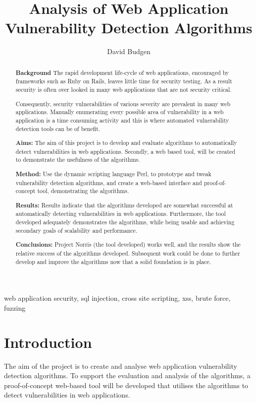 \documentclass[12pt,a4paper]{article}
\title{Analysis of Web Application Vulnerability Detection Algorithms}
\author{David Budgen}
\date{}
\begin{document}
\maketitle

\begin{abstract}
    
    {\bf Background}
    The rapid development life-cycle of web applications, encouraged by frameworks such as Ruby on Rails, leaves little time for security testing.  As a result security is often over looked in many web applications that are not security critical.

    Consequently, security vulnerabilities of various severity are prevalent in many web applications.  Manually enumerating every possible area of vulnerability in a web application is a time consuming activity and this is where automated vulnerability detection tools can be of benefit.
    
    {\bf Aims:}
    The aim of this project is to develop and evaluate algorithms to automatically detect vulnerabilities in web applications.  Secondly, a web based tool, will be created to demonstrate the usefulness of the algorithms. 
    
    {\bf Method:}
    Use the dynamic scripting language Perl, to prototype and tweak vulnerability detection algorithms, and create a web-based interface and proof-of-concept tool, demonstrating the algorithms.
    
    {\bf Results:}
    Results indicate that the algorithms developed are somewhat successful at automatically detecting vulnerabilities in web applications.  Furthermore, the tool developed adequately demonstrates the algorithms, while being usable and achieving secondary goals of scalability and performance.
    
    {\bf Conclusions:}
    Project Norris (the tool developed) works well, and the results show the relative success of the algorithms developed.  Subsequent work could be done to further develop and improve the algorithms now that a solid foundation is in place.
\end{abstract}

\begin{keywords}
    web application security, sql injection, cross site scripting, xss, brute force, fuzzing
\end{keywords}

\section{Introduction}
The aim of the project is to create and analyse web application vulnerability detection algorithms.  To support the evaluation and analysis of the algorithms, a proof-of-concept web-based tool will be developed that utilises the algorithms to detect vulnerabilities in web applications.
\end{document}
